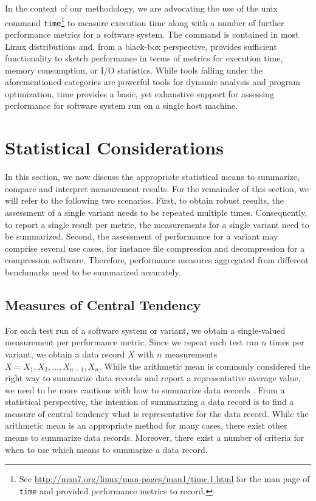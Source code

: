 In the context of our methodology, we are advocating the use of the unix
command \texttt{time}\footnote{See
\url{http://man7.org/linux/man-pages/man1/time.1.html} for the man page of
\texttt{time} and provided performance metrics to record.} to measure execution
time along with a number of further performance metrics for a software system.
The command is contained in most Linux distributions and, from a black-box
perspective, provides sufficient functionality to sketch performance in terms of
metrics for execution time, memory consumption, or I/O statistics. While tools falling under the aforementioned categories are powerful tools for dynamic analysis and program
optimization, time provides a basic, yet exhaustive support for assessing
performance for software system run on a single host machine. 

\section{Statistical Considerations}\label{sec:statistical_considerations}
In this section, we now discuss the appropriate statistical means to summarize,
compare and interpret measurement results. For the remainder of this section, we
will refer to the following two scenarios. First, to obtain robust results, the
assessment of a single variant needs to be repeated multiple times.
Consequently, to report a single result per metric, the measurements for a
single variant need to be summarized. Second, the assessment of performance for
a variant may comprise several use cases, for instance file
compression and decompression for a compression software. Therefore, performance measures
aggregated from different benchmarks need to be summarized accurately. 

\subsection{Measures of Central Tendency}
For each test run of a software system or variant, we obtain a single-valued
measurement per performance metric. Since we repeat each test run $n$ times
per variant, we obtain a data record $X$ with $n$ measurements $X = X_1, X_2,
\ldots, X_{n-1}, X_n$. While the arithmetic mean is commonly considered the
right way to summarize data records and report a representative average
value, we need to be more cautious with how to summarize data records
\citep{fleming_how_1986,smith_characterizing_1988}. From a statistical
perspective, the intention of summarizing a data record is to find a measure of
central tendency what is representative for the data record.
While the arithmetic mean is an appropriate method for many cases, there exist
other means to summarize data records. Moreover, there exist a number of
criteria for when to use which means to summarize a data record. 


